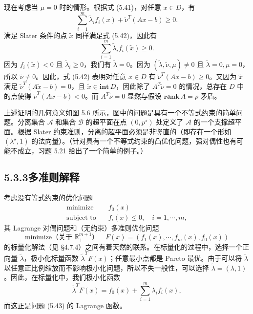 \documentclass[UTF8,12pt,a4paper,fontset=fandol]{ctexart}
\begin{document}
现在考虑当 $\mu=0$ 时的情形。根据式 (5.41)，对任意 $x\in D$，有
\begin{equation}
\sum_{i=1}^m \tilde{\lambda}_i f_i(x)+\tilde{\nu}^T(Ax-b)\geq 0.
\tag{5.42}
\end{equation}
满足 Slater 条件的点 $\tilde{x}$ 同样满足式 (5.42)，因此有
\[
\sum_{i=1}^m \tilde{\lambda}_i f_i(\tilde{x})\geq 0.
\]
因为 $f_i(\tilde{x})<0$ 且 $\tilde{\lambda}_i\geq 0$，我们有 $\tilde{\lambda}=0$。因为 $(\tilde{\lambda},\tilde{\nu},\mu)\neq 0$ 且 $\tilde{\lambda}=0,\mu=0$，所以 $\tilde{\nu}\neq 0$。因此，式 (5.42) 表明对任意 $x\in D$ 有 $\tilde{\nu}^T(Ax-b)\geq 0$。又因为 $\tilde{x}$ 满足 $\tilde{\nu}^T(A\tilde{x}-b)=0$，且 $\tilde{x}\in\mathbf{int}\,D$，因此除了 $A^T\tilde{\nu}=0$ 的情况，总存在 $D$ 中的点使得 $\tilde{\nu}^T(Ax-b)<0$。而 $A^T\tilde{\nu}=0$ 显然与假设 $\mathbf{rank}\,A=p$ 矛盾。

上述证明的几何意义如图 5.6 所示，图中的问题是具有一个不等式约束的简单问题。分离集合 $\mathcal{A}$ 和集合 $\mathcal{B}$ 的超平面在点 $(0,p^\star)$ 处定义了 $\mathcal{A}$ 的一个支撑超平面。根据 Slater 约束准则，分离的超平面必须是非竖直的（即存在一个形如 $(\lambda^\star,1)$ 的法向量）。（针对具有一个不等式约束的凸优化问题，强对偶性也有可能不成立，习题 5.21 给出了一个简单的例子。）

\subsection*{5.3.3\quad 多准则解释}

考虑没有等式约束的优化问题
\begin{equation}
\begin{aligned}
\text{minimize}\quad & f_0(x)\\
\text{subject to}\quad & f_i(x)\leq 0,\quad i=1,\cdots,m,
\end{aligned}
\tag{5.43}
\end{equation}
其 Lagrange 对偶问题和（无约束）多准则优化问题
\begin{equation}
\text{minimize（关于 $\mathbb{R}_+^{m+1}$）}\quad
F(x)=(f_1(x),\cdots,f_m(x),f_0(x))
\tag{5.44}
\end{equation}
的标量化解法（见 §4.7.4）之间有着天然的联系。在标量化的过程中，选择一个正向量 $\tilde{\lambda}$，极小化标量函数 $\tilde{\lambda}^TF(x)$；任意最小点都是 Pareto 最优。由于可以将 $\tilde{\lambda}$ 以任意正比例缩放而不影响极小化问题，所以不失一般性，可以选择 $\tilde{\lambda}=(\lambda,1)$。因此，在标量化中，我们极小化函数
\[
\tilde{\lambda}^TF(x)=f_0(x)+\sum_{i=1}^m\lambda_i f_i(x),
\]
而这正是问题 (5.43) 的 Lagrange 函数。
\end{document}
